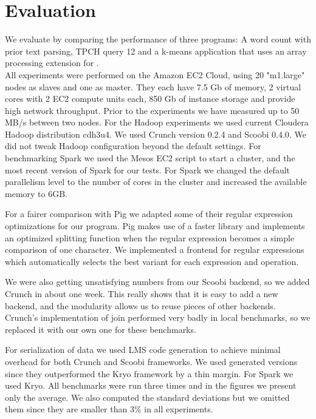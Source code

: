\section{Evaluation}
\label{sec:evaluation}

We evaluate \tool by comparing the performance of three programs: A word count with prior text parsing, TPCH query 12 and a k-means application that uses an array processing extension for \tool. \\

All experiments were performed on the Amazon EC2 Cloud, using 20 "m1.large" nodes as slaves and one as master. They each have 7.5 Gb of memory, 2 virtual cores with 2 EC2 compute units each, 850 Gb of instance storage and provide high network throughput. Prior to the experiments we have measured up to 50 MB/s between two nodes. For the Hadoop experiments we used current Cloudera Hadoop distribution cdh3u4. We used Crunch version 0.2.4 and Scoobi 0.4.0. We did not tweak Hadoop configuration beyond the default settings. For benchmarking Spark we used the Mesos \cite{hindman_mesos:_2011} EC2 script to start a cluster, and the most recent version of Spark for our tests. For Spark we changed the default parallelism level to the number of cores in the cluster and increased the available memory to 6GB. 

For a fairer comparison with Pig we adapted some of their regular expression optimizations for our program. Pig makes use of a faster library \cite{mollerdk} and implements an optimized splitting function when the regular expression becomes a simple comparison of one character. We implemented a frontend for regular expressions which automatically selects the best variant for each expression and operation. 

We were also getting unsatisfying numbers from our Scoobi backend, so we added Crunch in about one week. This really shows that it is easy to add a new backend, and the modularity allows us to reuse pieces of other backends. Crunch's implementation of join performed very badly in local benchmarks, so we replaced it with our own one for these benchmarks.

For serialization of data we used LMS code generation to achieve minimal overhead for both Crunch and Scoobi frameworks. We used generated versions since they outperformed the Kryo framework by a thin margin. For Spark we used Kryo. All benchmarks were run three times and in the figures we present only the average. We also computed the standard deviations but we omitted them since they are smaller than 3\% in all experiments.

